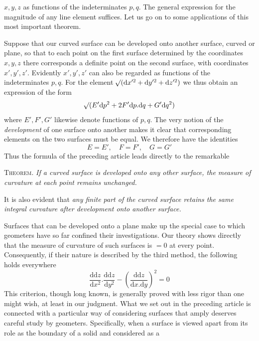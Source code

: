 %
 \(x,y,z\) as functions of the indeterminates \(p,q\). The general expression for the magnitude of any line element suffices. Let us go on to some applications of this most important theorem.

Suppose that our curved surface can be developed onto another surface, curved or plane, so that to each point on the first surface determined by the coordinates \(x,y,z\) there corresponds a definite point on the second surface, with coordinates \(x',y',z'\). Evidently \(x',y',z'\) can also be regarded as functions of the indeterminates \(p,q\). For the element \(\mathord{{}^{}\!\surd}(\mathrm{d}x'^2+\mathrm{d}y'^2+\mathrm{d}z'^2)\) we thus obtain an expression of the form
\[
\mathord{{}^{}\!\surd}(E'\mathrm{d}p^2+2F'\mathrm{d}p\mathord{.}\mathrm{d}q+G'\mathrm{d}q^2)
\]
where \(E',F',G'\) likewise denote functions of \(p,q\). The very notion of the \textit{development} of one surface onto another makes it clear that corresponding elements on the two surfaces must be equal. We therefore have the identities
\[
E=E',\quad F=F',\quad G=G'
\]
Thus the formula of the preceding article leads directly to the remarkable

\textsc{Theorem.} \textit{If a curved surface is developed onto any other surface, the measure of curvature at each point remains unchanged.}

It is also evident that \textit{any finite part of the curved surface retains the same integral curvature after development onto another surface.}

Surfaces that can be developed onto a plane make up the special case to which geometers have so far confined their investigations. Our theory shows directly that the measure of curvature of such surfaces is \(=0\) at every point. Consequently, if their nature is described by the third method, the following holds everywhere
\[
\frac{\mathrm{d}\mathrm{d}z}{\mathrm{d}x^2}\mathord{.}\frac{\mathrm{d}\mathrm{d}z}{\mathrm{d}y^2}-(\frac{\mathrm{d}\mathrm{d}z}{\mathrm{d}x\mathord{.}\mathrm{d}y})^2=0
\]
This criterion, though long known, is generally proved with less rigor than one might wish, at least in our judgment.
What we set out in the preceding article is connected with a particular way of considering surfaces that amply deserves careful study by geometers. Specifically, when a surface is viewed apart from its role as the boundary of a solid and considered as a
